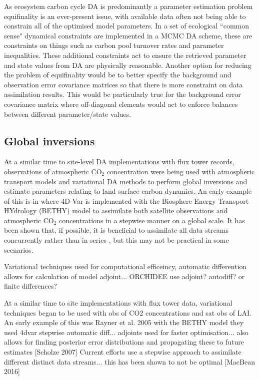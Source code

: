 \documentclass[12pt]{article}
\begin{document}
As ecosystem carbon cycle DA is predominantly a parameter estimation problem equifinality is an ever-present issue, with available data often not being able to constrain all of the optimised model parameters. In \citet{Bloom2015} a set of ecological ``common sense" dynamical constraints are implemented in a MCMC DA scheme, these are constraints on things such as carbon pool turnover rates and parameter inequalities. These additional constraints act to ensure the retrieved parameter and state values from DA are physically reasonable. Another option for reducing the problem of equifinality would be to better specify the background and observation error covariance matrices so that there is more constraint on data assimilation results. This would be particularly true for the background error covariance matrix where off-diagonal elements would act to enforce balances between different parameter/state values.    



\subsection{Global inversions}

At a similar time to site-level DA implementations with flux tower records, observations of atmospheric CO\(_{2}\) concentration were being used with atmospheric transport models and variational DA methods to perform global inversions and estimate parameters relating to land surface carbon dynamics. An early example of this is in \citet{rayner2005two} where 4D-Var is implemented with the Biosphere Energy Transport HYdrology (BETHY) model \citep{knorr2001uncertainties} to assimilate both satellite observations and atmospheric CO\(_{2}\) concentrations in a stepwise manner on a global scale. It has been shown that, if possible, it is beneficial to assimilate all data streams concurrently rather than in series \citep{macbean2016consistent}, but this may not be practical in some scenarios. 


Variational techniques used for computational efficeincy, automatic differention allows for calculation of model adjoint...
ORCHIDEE use adjoint? autodiff? or finite differences? 


At a similar time to site implementations with flux tower data, variational techniques began to be used with obs of CO2 concentrations and sat obs of LAI. An early example of this was Rayner et al. 2005 with the BETHY model they used 4dvar stepwise automatic diff...
adjoints used for faster optimisation... also allows for finding posterior error distributions and propagating these to future estimates [Scholze 2007]
Current efforts use a stepwise approach to assimilate different distinct data streams... this has been shown to not be optimal [MacBean 2016]
\end{document}
